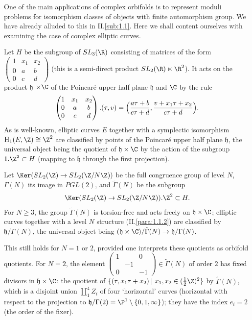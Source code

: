 \begin{para}\label{para::4.1.7} One of the main applications of complex
 orbifolds is to represent moduli problems for isomorphism classes of
 objects with finite automorphism group. We have already alluded to this
 in II.\ref{sub:1.1}.  Here we shall content ourselves with examining
 the case of complex elliptic curves.

 \noindent Let $H$ be the subgroup of $SL_3(\R)$ consisting
 of matrices of the form
 $\begin{pmatrix}
 1&x_1&x_2\\ 0&a&b\\ 0&c&d
  \end{pmatrix}$ (this is a
 semi-direct product $SL_2(\R)\ltimes\R^2$).  It acts on the product
 $\mathfrak{h}$ 
 $\times\C$ of the Poincar\'e upper half plane $\mathfrak{h}$ and $\C$ by
 the rule 
 \begin{equation*}
  \begin{pmatrix}
   1&x_1&x_2\\0&a&b\\0&c&d
  \end{pmatrix}.
  (\tau, v)=\Bigl(\frac{a\tau+b}{c\tau +d},\frac{v+x_1\tau+x_2}{c\tau+d}\Bigr).
 \end{equation*}
 As is well-known, elliptic curves $E$ together with a symplectic isomorphism
 $\mathrm{H}_1(E,\Z)\cong \Z^2$ are classified by points of the
 Poincar\'e upper half plane $\mathfrak{h}$, the universal object being
 the quotient of $\mathfrak{h}\times\C$ by the action of the subgroup 
 $1.\Z^2\subset H$ (mapping to $\mathfrak{h}$ through the first projection). 

 Let $\Ker(SL_2(\Z)\to SL_2(\Z/N\Z))$ be the full congruence group of
 level $N$, $\Gamma(N)$ its image in $PGL(2)$, and $\tilde\Gamma(N)$ be
 the subgroup 
 \begin{equation*}
  \Ker(SL_2(\Z)\to SL_2(\Z/N\Z)).\Z^2\subset H.
 \end{equation*}
 For $N\geq 3$, the group $\tilde \Gamma(N)$ is
 torsion-free and acts freely on $\mathfrak{h}\times\C$; elliptic curves 
 together with a level $N$ structure (\cf II.\ref{para:1.1.2}) are
 classified by $\mathfrak{h}/\Gamma(N)$, the universal object being
 $(\mathfrak{h}\times\C)/\tilde \Gamma(N)\to \mathfrak{h}/\Gamma(N)$. 
 
 This still holds for $N=1$ or $2$, provided one interprets these
 quotients as orbifold quotients. For $N=2$, the element 
  $\begin{pmatrix}1&&0\\ &-1&\\ 0&&-1 \end{pmatrix} \in
 \tilde \Gamma(N)$ of order $2$ has fixed divisors in
 $\mathfrak{h}\times\C$: the quotient of
 $\{(\tau,x_1\tau+x_2) \mid x_1,x_2\in (\frac{1}{2}\Z)^2\}$ by $\tilde
 \Gamma(N)$, which is a disjoint union $\coprod_1^4 Z_i$ of four
 `horizontal' curves (horizontal with respect to the projection to 
 $\mathfrak{h}/\Gamma(2)=\P^1\setminus\{0,1,\infty\}$); they have the
 index $e_i=2$ (the order of the fixer).
 

\end{para}
